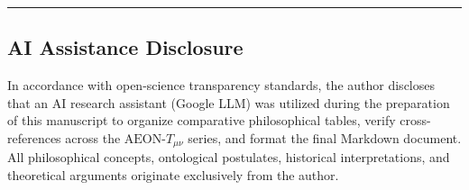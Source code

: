 \documentclass[
]{article}
\begin{document}
\begin{center}\rule{0.5\linewidth}{0.5pt}\end{center}

\subsection{AI Assistance Disclosure}\label{ai-assistance-disclosure}

In accordance with open-science transparency standards, the author
discloses that an AI research assistant (Google LLM) was utilized during
the preparation of this manuscript to organize comparative philosophical
tables, verify cross-references across the \(\text{AEON-}T_{\mu\nu}\)
series, and format the final Markdown document. All philosophical
concepts, ontological postulates, historical interpretations, and
theoretical arguments originate exclusively from the author.
\end{document}

